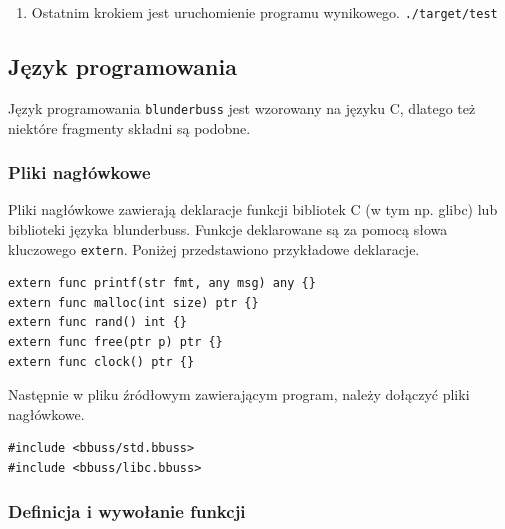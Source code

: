 \begin{enumerate}
\begin{itemize}
            \item \verb|-lstd| a dokładniej \verb|-l<nazwa>| przekazuje konsolidatorowi nazwę biblioteki, którą ma dodatkowo skonsolidować (oprócz np. domyślnej biblioteki glibc). Wzorzec szukanych bibliotek wygląda następująco \verb|lib<nazwa>.a| lub \verb|lib<nazwa>.so|. Zainstalowana standardowa biblioteka istnieje w katalogu pod nazwą \verb|libstd.a|.
            \item Ostatecznie, argument \verb|-o| wskazuje ścieżkę wynikowego programu wykonywalnego.
        \end{itemize}
    \item Ostatnim krokiem jest uruchomienie programu wynikowego.
    \break\verb|./target/test|
\end{enumerate}

\subsection{Język programowania}

Język programowania \verb|blunderbuss| jest wzorowany na języku C, dlatego też niektóre fragmenty składni są podobne.

\subsubsection{Pliki nagłówkowe}

Pliki nagłówkowe zawierają deklaracje funkcji bibliotek C (w tym np. glibc) lub biblioteki języka blunderbuss. Funkcje deklarowane są za pomocą słowa kluczowego \verb|extern|. Poniżej przedstawiono przykładowe deklaracje.

\begin{lstlisting}[caption={Deklaracje funkcji w pliku nagłówkowym}, label={lst:jp-header}, morekeywords={func, ptr, str}]
extern func printf(str fmt, any msg) any {}
extern func malloc(int size) ptr {}
extern func rand() int {}
extern func free(ptr p) ptr {}
extern func clock() ptr {}
\end{lstlisting}

Następnie w pliku źródłowym zawierającym program, należy dołączyć pliki nagłówkowe.

\begin{lstlisting}[caption={Dołączanie plików nagłówkowych}, label={lst:jp-header-include}]
#include <bbuss/std.bbuss>
#include <bbuss/libc.bbuss>
\end{lstlisting}

\subsubsection{Definicja i wywołanie funkcji}

